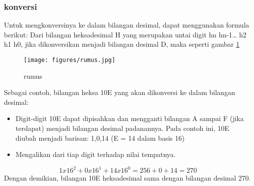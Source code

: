 \subsubsection{konversi}
Untuk mengkonversinya ke dalam bilangan desimal, dapat menggunakan formula berikut:
Dari bilangan heksadesimal H yang merupakan untai digit hn hn-1… h2 h1 h0, jika dikonversikan menjadi bilangan desimal D, maka seperti gambar \ref{rumus}
\begin{figure}[ht]
	\centerline{\texttt{[image: figures/rumus.jpg]}}
	\caption{rumus}
	\label{rumus}
	\end{figure}
Sebagai contoh, bilangan heksa 10E yang akan dikonversi ke dalam bilangan desimal:
\begin{itemize}
\item Digit-digit 10E dapat dipisahkan dan mengganti bilangan A sampai F (jika terdapat) menjadi bilangan desimal padanannya. Pada contoh ini, 10E diubah menjadi barisan: 1,0,14 (E = 14 dalam basis 16)
\item Mengalikan dari tiap digit terhadap nilai tempatnya.
\end{itemize}
\begin{equation}
1 x 16^2 + 0 x 16^1 + 14 x 16^0
= 256 + 0 + 14
= 270
\end{equation}
Dengan demikian, bilangan 10E heksadesimal sama dengan bilangan desimal 270.


